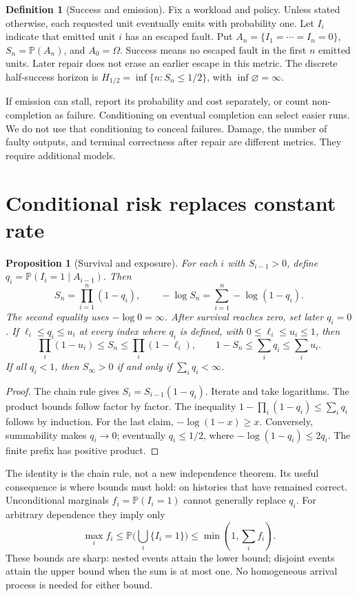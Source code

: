 \documentclass[11pt]{article}
\newtheorem{proposition}[theorem]{Proposition}
\theoremstyle{definition}
\newtheorem{definition}[theorem]{Definition}
\theoremstyle{remark}
\newcommand{\Prb}{\mathbb P}
\begin{document}
\begin{definition}[Success and emission]\label{def:success}
Fix a workload and policy. Unless stated otherwise, each requested unit eventually emits with
probability one. Let $I_i$ indicate that emitted unit $i$ has an escaped fault. Put
$A_n=\{I_1=\cdots=I_n=0\}$, $S_n=\Prb(A_n)$, and $A_0=\Omega$.
Success means no escaped fault in the first $n$ emitted units. Later repair does not erase an
earlier escape in this metric. The discrete half-success horizon is
$H_{1/2}=\inf\{n:S_n\le1/2\}$, with $\inf\varnothing=\infty$.
\end{definition}
If emission can stall, report its probability and cost separately, or count non-completion as
failure. Conditioning on eventual completion can select easier runs. We do not use that
conditioning to conceal failures. Damage, the number of faulty outputs, and terminal correctness
after repair are different metrics. They require additional models.

\section{Conditional risk replaces constant rate}
\begin{proposition}[Survival and exposure]\label{prop:survival}
For each $i$ with $S_{i-1}>0$, define $q_i=\Prb(I_i=1\mid A_{i-1})$. Then
\begin{equation}\label{eq:survival}
S_n=\prod_{i=1}^n(1-q_i),\qquad
-\log S_n=\sum_{i=1}^n-\log(1-q_i).
\end{equation}
The second equality uses $-\log0=\infty$. After survival reaches zero, set later $q_i=0$.
If $\ell_i\le q_i\le u_i$ at every index where $q_i$ is defined, with $0\le\ell_i\le u_i\le1$, then
\[
\prod_i(1-u_i)\le S_n\le\prod_i(1-\ell_i),\qquad
1-S_n\le\sum_i q_i\le\sum_i u_i.
\]
If all $q_i<1$, then $S_\infty>0$ if and only if $\sum_i q_i<\infty$.
\end{proposition}
\begin{proof}
The chain rule gives $S_i=S_{i-1}(1-q_i)$. Iterate and take logarithms.
The product bounds follow factor by factor. The inequality
$1-\prod_i(1-q_i)\le\sum_iq_i$ follows by induction.
For the last claim, $-\log(1-x)\ge x$. Conversely, summability makes $q_i\to0$;
eventually $q_i\le1/2$, where $-\log(1-q_i)\le2q_i$. The finite prefix has positive product.
\end{proof}

The identity is the chain rule, not a new independence theorem. Its useful consequence is
where bounds must hold: on histories that have remained correct. Unconditional marginals
$f_i=\Prb(I_i=1)$ cannot generally replace $q_i$.
For arbitrary dependence they imply only
\begin{equation}\label{eq:marginal}
\max_i f_i\le\Prb\Big(\bigcup_i\{I_i=1\}\Big)\le\min(1,\sum_i f_i).
\end{equation}
These bounds are sharp: nested events attain the lower bound; disjoint events attain the upper
bound when the sum is at most one. No homogeneous arrival process is needed for either bound.
\end{document}
